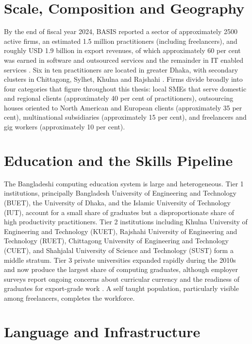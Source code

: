\documentclass[11pt,a4paper]{report}
\begin{document}
\section{Scale, Composition and Geography}

By the end of fiscal year 2024, BASIS reported a sector of approximately
2500 active firms, an estimated 1.5 million practitioners (including
freelancers), and roughly USD 1.9 billion in export revenues, of which
approximately 60 per cent was earned in software and outsourced services
and the remainder in IT enabled services
\citep{BASIS2024,BASIS2025}. Six in ten practitioners are located in
greater Dhaka, with secondary clusters in Chittagong, Sylhet, Khulna and
Rajshahi \citep{BBS2024LFS}. Firms divide broadly into four categories
that figure throughout this thesis: local SMEs that serve domestic and
regional clients (approximately 40 per cent of practitioners),
outsourcing houses oriented to North American and European clients
(approximately 35 per cent), multinational subsidiaries (approximately
15 per cent), and freelancers and gig workers (approximately 10 per cent).

\section{Education and the Skills Pipeline}

The Bangladeshi computing education system is large and heterogeneous.
Tier 1 institutions, principally Bangladesh University of Engineering
and Technology (BUET), the University of Dhaka, and the Islamic
University of Technology (IUT), account for a small share of graduates
but a disproportionate share of high productivity practitioners. Tier 2
institutions including Khulna University of Engineering and Technology
(KUET), Rajshahi University of Engineering and Technology (RUET),
Chittagong University of Engineering and Technology (CUET), and Shahjalal
University of Science and Technology (SUST) form a middle stratum. Tier 3
private universities expanded rapidly during the 2010s and now produce
the largest share of computing graduates, although employer surveys
report ongoing concerns about curricular currency and the readiness of
graduates for export-grade work \citep{ChowdhuryRahman2025}. A self
taught population, particularly visible among freelancers, completes
the workforce.

\section{Language and Infrastructure}
\end{document}
